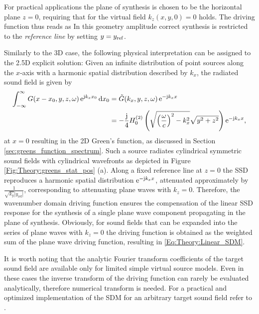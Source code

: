 For practical applications the plane of synthesis is chosen to be the horizontal plane $z=0$, requiring that for the virtual field $k_z(x,y,0) = 0$ holds.
The driving function thus reads as
In this geometry amplitude correct synthesis is restricted to the \emph{reference line} by setting $y = y_{\mathrm{ref}}$.

Similarly to the 3D case, the following physical interpretation can be assigned to the 2.5D explicit solution:
Given an infinite distribution of point sources along the $x$-axis with a harmonic spatial distribution described by $k_x$, the radiated sound field is given by
\begin{align}
\int_{-\infty}^{\infty} G(x - x_0,y,z,\omega) \, \mathrm{e}^{\mathrm{j} k_x x_0} \, \mathrm{d} x_0 &= \tilde{G}(k_x,y,z,\omega) \, \mathrm{e}^{-\mathrm{j} k_x x} \\
&=  -\frac{\mathrm{j}}{4} H_0^{(2)}\left( \sqrt{\left( \frac{\omega}{c} \right)^2-k_x^2} \sqrt{y^2+z^2} \right)  \mathrm{e}^{-\mathrm{j} k_x x},
\end{align}
at $x=0$ resulting in the 2D Green's function, as discussed in Section \ref{sec:greens_function_spectrum}.
Such a source radiates cylindrical symmetric sound fields with cylindrical wavefronts as depicted in Figure \eqref{Fig:Theory:greens_stat_pos} (a). 
Along a fixed reference line at $z=0$ the SSD reproduces a harmonic spatial distribution $\mathrm{e}^{-\mathrm{j} k_x x}$, attenuated approximately by $\frac{1}{\sqrt{k_y}|y_{\mathrm{ref}}|}$, corresponding to attenuating plane waves with $k_z=0$.
Therefore, the wavenumber domain driving function ensures the compensation of the linear SSD response for the synthesis of a single plane wave component propagating in the plane of synthesis.
Obviously, for sound fields that can be expanded into the series of plane waves with $k_z=0$ the driving function is obtained as the weighted sum of the plane wave driving function, resulting in \eqref{Eq:Theory:Linear_SDM}.

It is worth noting that the analytic Fourier transform coefficients of the target sound field are available only for limited simple virtual source models. 
Even in these cases the inverse transform of the driving function can rarely be evaluated analytically, therefore numerical transform is needed.
For a practical and optimized implementation of the SDM for an arbitrary target sound field refer to \cite{ahrens2013a:efficientSDM}.

